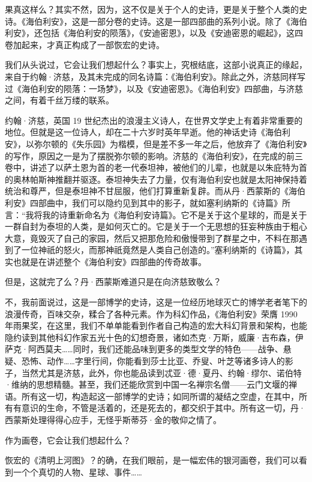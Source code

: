 \documentclass[AutoFakeBold=true]{book}
\begin{document}
果真这样么？其实不然，因为，这不仅是关于个人的史诗，更是关于整个人类的史诗。《海伯利安》，这是一部分卷的史诗。这是一部四部曲的系列小说。除了《海伯利安》，还包括《海伯利安的陨落》，《安迪密恩》，以及《安迪密恩的崛起》，这四卷加起来，才真正构成了一部恢宏的史诗。

我们从头说过，它会让我们想起什么？事实上，究根结底，这部小说真正的缘起，来自于约翰·济慈，及其未完成的同名诗篇：《海伯利安》。除此之外，济慈同样写过《海伯利安的陨落：一场梦》，以及《安迪密恩》。《海伯利安》四部曲，与济慈之间，有着千丝万缕的联系。

约翰·济慈，英国 19 世纪杰出的浪漫主义诗人，在世界文学史上有着非常重要的地位。但就是这一位诗人，却在二十六岁时英年早逝。他的神话史诗《海伯利安》，以弥尔顿的《失乐园》为楷模，但是差不多一年之后，他放弃了《海伯利安》的写作，原因之一是为了摆脱弥尔顿的影响。济慈的《海伯利安》，在完成的前三卷中，讲述了以萨土恩为首的老一代泰坦神，被他们的儿辈，也就是以朱庇特为首的奥林帕斯神推翻并驱逐。泰坦神失去了力量，仅有海伯利安也就是太阳神保持着统治和尊严，但是泰坦神不甘屈服，他们打算重新复辟。而从丹·西蒙斯的《海伯利安》四部曲中，我们可以隐约见到其中的影子，就如塞利纳斯的《诗篇》所言：``我将我的诗重新命名为《海伯利安诗篇》。它不是关于这个星球的，而是关于一群自封为泰坦的人类，是如何灭亡的。它是关于一个无思想的狂妄种族由于粗心大意，竟毁灭了自己的家园，然后又把那危险和傲慢带到了群星之中，不料在那遇到了一位神祇的怒火，而那神祇竟然是人类自己创造的。''塞利纳斯的《诗篇》，其实也就是在讲述整个《海伯利安》四部曲的传奇故事。

但是，这就完了么？丹·西蒙斯难道只是在向济慈致敬么？

不，我前面说过，这是一部博学的史诗，这是一位经历地球灭亡的博学老者笔下的浪漫传奇，百味交杂，糅合了各种元素。作为科幻作品，《海伯利安》荣膺 1990 年雨果奖，在这里，我们不单单能看到作者自己构造的宏大科幻背景和架构，也能隐约读到其他科幻作家五光十色的幻想奇景，诸如杰克·万斯，威廉·吉布森，伊萨克·阿西莫夫……同时，我们还能品味到更多的类型文学的特色——战争、悬疑、恐怖、动作……字里行间，你能看到莎士比亚、乔叟、叶芝等诸多诗人的影子，当然尤其是济慈，此外，你也能品读到忒亚·德·夏丹、约翰·缪尔、诺伯特·维纳的思想精髓。甚至，我们还能欣赏到中国一名禅宗名僧——云门文堰的禅语。所有这一切，构造起这一部博学的史诗；如同所谓的凝结之空虚，在其中，所有有意识的生命，不管是活着的，还是死去的，都交织于其中。所有这一切，丹·西蒙斯处理得得心应手，无怪乎斯蒂芬·金的敬仰之情了。

作为画卷，它会让我们想起什么？

恢宏的《清明上河图》？的确，在我们眼前，是一幅宏伟的银河画卷，我们可以看到一个个真切的人物、星球、事件……
\end{document}

